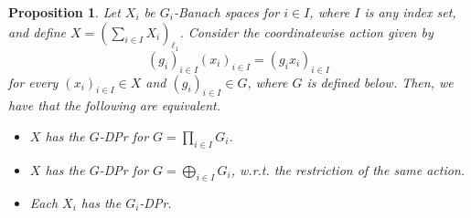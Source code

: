 \documentclass[10pt,a4paper]{amsart}
\newtheorem{proposition}{Proposition}
\begin{document}
	\begin{proposition} \label{stability-ell1}
		Let $X_i$ be $G_i$-Banach spaces for $i \in I$, where $I$ is any index set, and define $X = \left(\sum_{i \in I} X_i\right)_{\ell_1}$. Consider the coordinatewise action given by
		\begin{equation*}
			(g_i)_{i \in I}(x_i)_{i \in I} = (g_i x_i)_{i \in I}
		\end{equation*}
		for every $(x_i)_{i \in I} \in X$ and $(g_i)_{i \in I} \in G$, where $G$ is defined below. Then, we have that the following are equivalent.
		\begin{itemize}
			\item[(a)] $X$ has the $G$-DPr for $G = \prod_{i\in I} G_i$.
			\item[(b)] $X$ has the $G$-DPr for $G = \bigoplus_{i \in I} G_i$, w.r.t. the restriction of the same action.
			\item[(c)] Each $X_i$ has the $G_i$-DPr.
		\end{itemize}
	\end{proposition}
\end{document}
